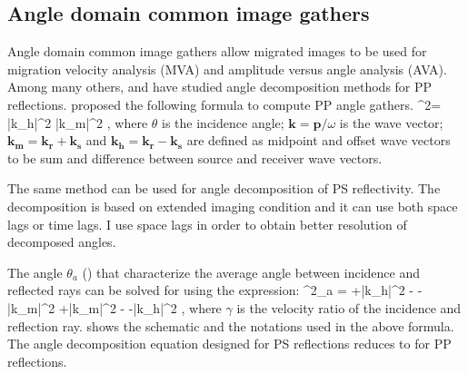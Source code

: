 





\subsection{Angle domain common image gathers}


\def\p{{\mathbf p}}
\def\k{{\mathbf k}}
\def\r{{\mathbf r}}
\def\s{{\mathbf s}}
\def\h{{\mathbf h}}
\def\m{{\mathbf m}}
%
%
%
Angle domain common image gathers allow migrated images to be used for migration velocity analysis (MVA) and amplitude versus angle analysis (AVA). Among many others, \cite{GEO55-09-12231234} and \cite{SEG-2003-21042107} have studied angle decomposition methods for PP reflections.
\cite{sava:2460} proposed the following formula to compute PP angle gathers.
\beq\label{eqn:PPang}
\tan^2\theta = \frac
{|\k_\h|^2  }
{|\k_\m|^2  } \; ,
\eeq
where $\theta$ is the incidence angle; $\k=\p/\omega$ is the wave vector; $\k_\m = \k_\r+\k_\s $ and $\k_\h = \k_\r-\k_\s$ are defined as midpoint and offset wave vectors to be sum and difference between source and receiver wave vectors.

The same method can be used for angle decomposition of PS reflectivity. The decomposition is based on extended imaging condition and it can use both space lags or time lags. I use space lags in order to obtain better resolution of decomposed angles.

The angle $\theta_a$ () that characterize the average angle between incidence and reflected rays can be solved for using the expression:
\beq\label{eqn:PSang}
\tan^2\theta_a = \frac
{ +\gamma \rp |\k_\h|^2 - -\gamma \rp |\k_\m|^2 }
{ +\gamma \rp |\k_\m|^2 - -\gamma \rp |\k_\h|^2 } \; ,
\eeq
 where $\gamma$ is the velocity ratio of the incidence and reflection ray. 
 shows the schematic and the notations used in the above formula.
The angle decomposition equation  designed for PS reflections reduces to  for PP reflections.

